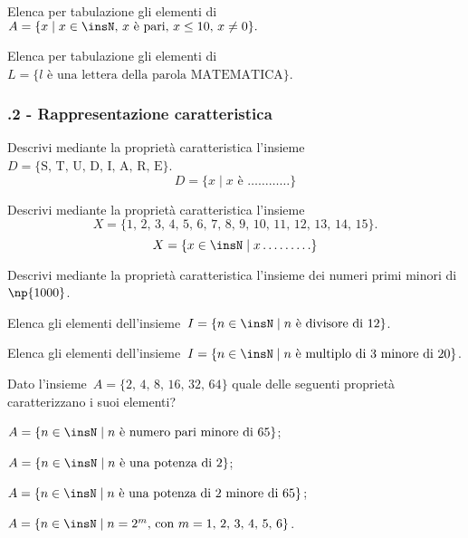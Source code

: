 \begin{esercizio}
\label{ese:6.4}
Elenca per tabulazione gli elementi di~$A=\{x\mid x\in\insN\text{, }x\text{ è pari, }x\leq10\text{, }x\neq0\}.$
\end{esercizio}

\begin{esercizio}
\label{ese:6.5}
Elenca per tabulazione gli elementi di~$L=\{l\text{ è una lettera della parola MATEMATICA}\}$.
\end{esercizio}

\subsubsection*{\thechapter.2 - Rappresentazione caratteristica}

\begin{esercizio}
\label{ese:6.6}
Descrivi mediante la proprietà caratteristica
l'insieme~$D= \{\text{S, T, U, D, I, A, R, E}\}$.
\[D=\{x\mid x\text{ è }\ldots\ldots\ldots\ldots\}\]
\end{esercizio}


\begin{esercizio}
\label{ese:6.7}
Descrivi mediante la proprietà caratteristica l'insieme
\[X=\{\text{1, 2, 3, 4, 5, 6, 7, 8, 9, 10, 11, 12, 13, 14, 15}\}.\]
\[X=\{x\in\insN\mid x\ldots\ldots\ldots\}\]
\end{esercizio}

\begin{esercizio}
\label{ese:6.8}
Descrivi mediante la proprietà caratteristica l'insieme dei numeri primi minori di~$\np{1000}$.
\end{esercizio}

\begin{esercizio}
\label{ese:6.9}
Elenca gli elementi dell'insieme~$I=\{n\in\insN\mid n\text{ è divisore di }12\}$.
\end{esercizio}

\begin{esercizio}
\label{ese:6.10}
Elenca gli elementi dell'insieme~$I=\{n\in\insN\mid n\text{ è multiplo di~3 minore di }20\}$.
\end{esercizio}
\pagebreak
\begin{esercizio}
\label{ese:6.11}
Dato l'insieme~$A=\{\text{2, 4, 8, 16, 32, 64}\}$ quale delle seguenti proprietà caratterizzano i suoi elementi?
\begin{enumeratea}
\item $A=\{n\in\insN\mid n \text{ è numero pari minore di 65}\}$;
\item $A=\{n\in\insN\mid n\text{ è una potenza di 2}\}$;
\item $A=\{n\in\insN\mid n\text{ è una potenza di~2 minore di 65}\}$;
\item $A=\{n\in\insN\mid n=2^{m}\text{, con }m=\text{1, 2, 3, 4, 5, 6}\}$.
\end{enumeratea}
\end{esercizio}

